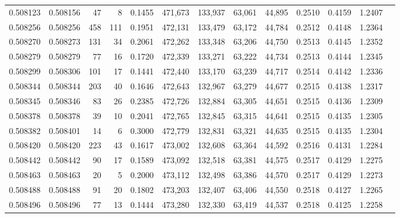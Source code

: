 \begin{tabular}{rrrrrrrrrrrrr}
0.508123 & 0.508156 &    47 &     8 &                                     0.1455 & 471,673 & 133,937 &  63,061 &  44,895 & 0.2510 & 0.4159 & 1.2407 \\
0.508256 & 0.508256 &   458 &   111 &                                     0.1951 & 472,131 & 133,479 &  63,172 &  44,784 & 0.2512 & 0.4148 & 1.2364 \\
0.508270 & 0.508273 &   131 &    34 &                                     0.2061 & 472,262 & 133,348 &  63,206 &  44,750 & 0.2513 & 0.4145 & 1.2352 \\
0.508279 & 0.508279 &    77 &    16 &                                     0.1720 & 472,339 & 133,271 &  63,222 &  44,734 & 0.2513 & 0.4144 & 1.2345 \\
0.508299 & 0.508306 &   101 &    17 &                                     0.1441 & 472,440 & 133,170 &  63,239 &  44,717 & 0.2514 & 0.4142 & 1.2336 \\
0.508344 & 0.508344 &   203 &    40 &                                     0.1646 & 472,643 & 132,967 &  63,279 &  44,677 & 0.2515 & 0.4138 & 1.2317 \\
0.508345 & 0.508346 &    83 &    26 &                                     0.2385 & 472,726 & 132,884 &  63,305 &  44,651 & 0.2515 & 0.4136 & 1.2309 \\
0.508378 & 0.508378 &    39 &    10 &                                     0.2041 & 472,765 & 132,845 &  63,315 &  44,641 & 0.2515 & 0.4135 & 1.2305 \\
0.508382 & 0.508401 &    14 &     6 &                                     0.3000 & 472,779 & 132,831 &  63,321 &  44,635 & 0.2515 & 0.4135 & 1.2304 \\
0.508420 & 0.508420 &   223 &    43 &                                     0.1617 & 473,002 & 132,608 &  63,364 &  44,592 & 0.2516 & 0.4131 & 1.2284 \\
0.508442 & 0.508442 &    90 &    17 &                                     0.1589 & 473,092 & 132,518 &  63,381 &  44,575 & 0.2517 & 0.4129 & 1.2275 \\
0.508463 & 0.508463 &    20 &     5 &                                     0.2000 & 473,112 & 132,498 &  63,386 &  44,570 & 0.2517 & 0.4129 & 1.2273 \\
0.508488 & 0.508488 &    91 &    20 &                                     0.1802 & 473,203 & 132,407 &  63,406 &  44,550 & 0.2518 & 0.4127 & 1.2265 \\
0.508496 & 0.508496 &    77 &    13 &                                     0.1444 & 473,280 & 132,330 &  63,419 &  44,537 & 0.2518 & 0.4125 & 1.2258 \\

\end{tabular}
